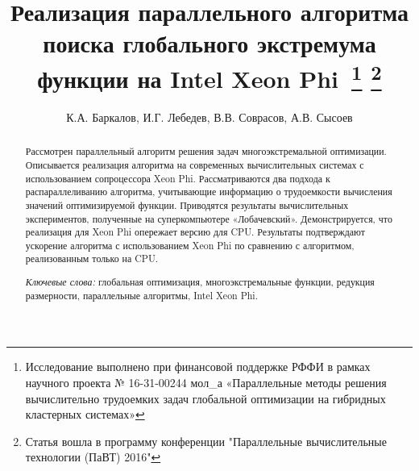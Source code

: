 \documentclass[a4paper]{article}
\begin{document}
\title{Реализация параллельного алгоритма поиска глобального экстремума функции на Intel Xeon Phi\
\footnote{
Исследование выполнено при финансовой поддержке РФФИ в рамках научного проекта № 16-31-00244 мол\_а «Параллельные методы решения вычислительно трудоемких задач глобальной оптимизации на гибридных кластерных системах»}
\footnote{
Статья вошла в программу конференции "Параллельные вычислительные технологии (ПаВТ) 2016"}}
\author{К.А. Баркалов, И.Г. Лебедев, В.В. Соврасов, А.В. Сысоев}
\date{}
\maketitle
\thispagestyle{firststyle}
\begin{abstract}
Рассмотрен параллельный алгоритм решения задач многоэкстремальной оптимизации. Описывается реализация алгоритма на современных вычислительных системах с использованием сопроцессора Xeon Phi. Рассматриваются два подхода к распараллеливанию алгоритма, учитывающие информацию о трудоемкости вычисления значений оптимизируемой функции. Приводятся результаты вычислительных экспериментов, полученные на суперкомпьютере «Лобачевский». Демонстрируется, что реализация для Xeon Phi опережает версию для CPU. Результаты подтверждают ускорение алгоритма с использованием Xeon Phi по сравнению с алгоритмом, реализованным только на CPU.
\par
\textit{Ключевые слова:} глобальная оптимизация, многоэкстремальные функции, редукция размерности, параллельные алгоритмы, Intel Xeon Phi.
\end{abstract}
\end{document}
